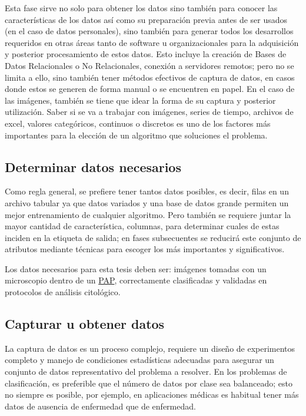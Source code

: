 Esta fase sirve no solo para obtener los datos sino también para conocer las
características de los datos así como su preparación previa antes de ser usados
(en el caso de datos personales), sino también para generar todos los
desarrollos requeridos en otras áreas tanto de software u organizacionales para
la adquisición y posterior procesamiento de estos datos. Esto incluye la
creación de Bases de Datos Relacionales o No Relacionales, conexión a servidores
remotos; pero no se limita a ello, sino también tener métodos efectivos de
captura de datos, en casos donde estos se generen de forma manual o se
encuentren en papel. En el caso de las imágenes, también se tiene que idear la
forma de su captura y posterior utilización. Saber si se va a trabajar con
imágenes, series de tiempo, archivos de excel, valores categóricos, continuos o
discretos es uno de los factores más importantes para la elección de un
algoritmo que soluciones el problema. 

\subsection{Determinar datos necesarios}

Como regla general, se prefiere tener tantos datos posibles, es decir, filas en
un archivo tabular ya que datos variados y una base de datos grande permiten un
mejor entrenamiento de cualquier algoritmo. Pero también se requiere juntar la
mayor cantidad de característica, columnas, para determinar cuales de estas
inciden en la etiqueta de salida; en fases subsecuentes se reducirá este
conjunto de atributos mediante técnicas para escoger los más importantes y
significativos.

Los datos necesarios para esta tesis deben ser: imágenes tomadas con un
microscopio dentro de un \hyperlink{abbr}{PAP}, correctamente clasificadas y
validadas en protocolos de análisis citológico.

\subsection{Capturar u obtener datos}

La captura de datos es un proceso complejo, requiere un diseño de experimentos
completo y manejo de condiciones estadísticas adecuadas para asegurar un
conjunto de datos representativo del problema a resolver. En los problemas de
clasificación, es preferible que el número de datos por clase sea balanceado;
esto no siempre es posible, por ejemplo, en aplicaciones médicas es habitual
tener más datos de ausencia de enfermedad que de enfermedad.


